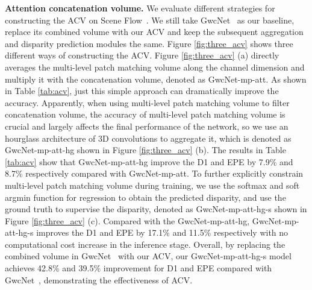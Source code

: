 \documentclass[10pt,twocolumn,letterpaper]{article}
\begin{document}
\textbf{Attention concatenation volume.} We evaluate different strategies for constructing the ACV on Scene Flow~\cite{dispNetC2016large}. We still take GwcNet~\cite{guo2019group} as our baseline, replace its combined volume with our ACV and keep the subsequent aggregation and disparity prediction modules the same. Figure \ref{fig:three_acv} shows three different ways of constructing the ACV. Figure \ref{fig:three_acv} (a) directly averages the multi-level patch matching volume along the channel dimension and multiply it with the concatenation volume, denoted as GwcNet-mp-att. As shown in Table \ref{tab:acv}, just this simple approach can dramatically improve the accuracy.
Apparently, when using multi-level patch matching volume to filter concatenation volume, the accuracy of multi-level patch matching volume is crucial and largely affects the final performance of the network, so we use an hourglass architecture of 3D convolutions to aggregate it, which is denoted as GwcNet-mp-att-hg shown in Figure \ref{fig:three_acv} (b). The results in Table \ref{tab:acv} show that GwcNet-mp-att-hg improve the D1 and EPE by 7.9\% and 8.7\% respectively compared with GwcNet-mp-att. To further explicitly constrain multi-level patch matching volume during training, we use the softmax and soft argmin function for regression to obtain the predicted disparity, and use the ground truth to supervise the disparity, denoted as GwcNet-mp-att-hg-s shown in Figure \ref{fig:three_acv} (c). Compared with the GwcNet-mp-att-hg, GwcNet-mp-att-hg-s improves the D1 and EPE by 17.1\% and 11.5\% respectively with no computational cost increase in the inference stage. Overall, by replacing the combined volume in GwcNet~\cite{guo2019group} with our ACV, our GwcNet-mp-att-hg-s model achieves 42.8\% and 39.5\% improvement for D1 and EPE compared with GwcNet~\cite{guo2019group}, demonstrating the effectiveness of ACV.
\end{document}
